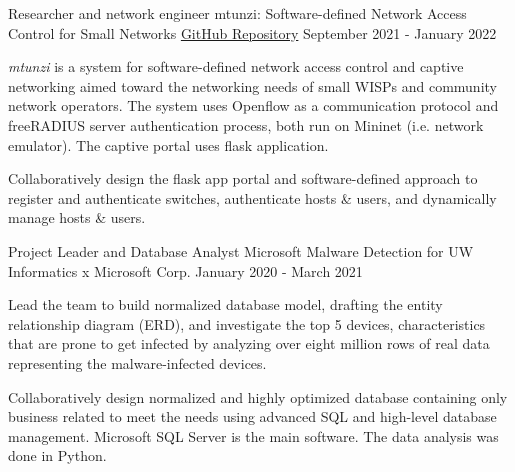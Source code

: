 \vspace{-1mm}


\begin{cventries}
 \cventry
    {Researcher and network engineer} %
    {mtunzi: Software-defined Network Access Control for Small Networks} %
    {\href{https://github.com/innoobijr/cse-550-finalproject-mtunzi}{GitHub Repository}} %
    {September 2021 - January 2022} %
    {
      \begin{cvitems} %
        \item {
          \textit{mtunzi} is a system for software-defined network access control and captive networking aimed toward the networking needs of small WISPs and community network operators. The system uses Openflow as a communication protocol and freeRADIUS server authentication process, both run on Mininet (i.e. network emulator).
            The captive portal uses flask application.
        }
        \item {
            Collaboratively design the flask app portal and software-defined approach to register and authenticate switches, authenticate hosts \& users, and dynamically manage hosts \& users.
        }
      \end{cvitems}
    }
 \cventry
    {Project Leader and Database Analyst} %
    {Microsoft Malware Detection for UW Informatics x Microsoft Corp.} %
    {} %
    {January 2020 - March 2021} %
    {
      \begin{cvitems} %
        \item {
          Lead the team to build normalized database model, drafting the entity relationship diagram (ERD), and investigate the top 5 devices, characteristics that are prone to get infected by analyzing over eight million rows of real data representing the malware-infected devices.
        }
        \item {
          Collaboratively design normalized and highly optimized database containing only business related to meet the needs using advanced SQL and high-level database management. Microsoft SQL Server is the main software. The data analysis was done in Python.
}
\end{cvitems}}
\end{cventries}
